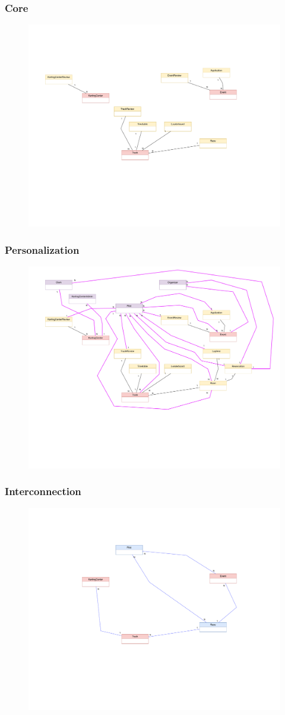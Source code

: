 \documentclass{beamer}
\begin{document}
\begin{frame}
    \frametitle{Core}
    \begin{figure}
        \centering
        \includegraphics[width=0.7\linewidth]{drawio/core-subschemes.pdf}
    \end{figure}
\end{frame}

\begin{frame}
    \frametitle{Personalization}
    \begin{figure}
        \centering
        \includegraphics[width=0.7\linewidth]{drawio/personalization-subschemes.pdf}
    \end{figure}
\end{frame}

\begin{frame}
    \frametitle{Interconnection}
    \begin{figure}
        \centering
        \includegraphics[width=0.7\linewidth]{drawio/interconnection-subschemes.pdf}
    \end{figure}
\end{frame}
\end{document}
